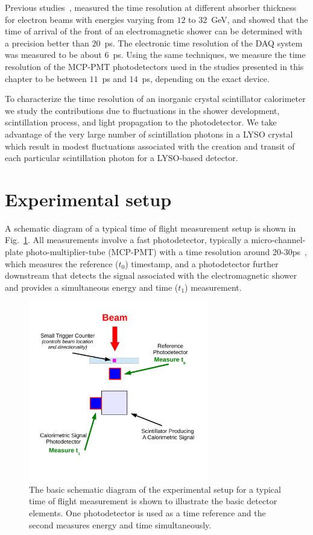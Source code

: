 Previous studies~\cite{MCPFastCaloNIMA}, measured the time resolution at different
absorber thickness for electron beams with energies varying from $12$ to
$32$~GeV, and showed that the time of arrival of the front of an electromagnetic
shower can be determined with a precision better than $20$~ps. The electronic
time resolution of the DAQ system was measured to be about $6$~ps. Using
the same techniques, we measure the time resolution of the MCP-PMT photodetectors 
used in the studies presented in this chapter to be between $11$~ps and $14$~ps, depending 
on the exact device.

To characterize the time resolution of an inorganic crystal scintillator calorimeter we
study the contributions due to fluctuations in the shower development, scintillation process, 
and light propagation to the photodetector.  We take advantage of the very large number of 
scintillation photons in a LYSO crystal which result in modest fluctuations associated with the 
creation and transit of each particular scintillation photon for a LYSO-based detector. 

\section{Experimental setup}

A schematic diagram of a typical time of flight measurement setup is shown in 
Fig.~\ref{fig:TypicalSchematicDiagram}. All measurements involve a fast photodetector,  
typically a micro-channel-plate photo-multiplier-tube 
(MCP-PMT) with a time resolution around 20-30\unit{ps}~\cite{MCPFastCaloNIMA}, which measures the reference ($t_{0}$) timestamp, and a photodetector further 
downstream that detects the signal associated with the electromagnetic shower and provides 
a simultaneous energy and time ($t_{1}$) measurement. 

\begin{figure}[H] \centering
\includegraphics[width=0.7\textwidth]{figs/timing/TypicalSchematicDiagram} 
\caption{ The basic schematic diagram of the experimental setup for
a typical time of flight measurement is shown to illustrate the
basic detector elements. One photodetector is used as a time reference and the second 
measures energy and time simultaneously.} 
\label{fig:TypicalSchematicDiagram}
\end{figure}

